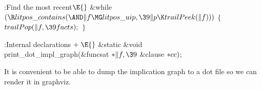 {{{{{
\Y\B\4:Find the most recent\X${}\E{}$\6
\&{while} ${}(\R\\{litpos\_contains}({\AND}\|f\MG\\{litpos\_uip},\39\|p\K%
\\{trailPeek}(\|f))){}$\5
${}\{{}$\1\6
${}\\{trailPop}(\|f,\39\\{facts});{}$\6
\4${}\}{}$\2\par
\fi

\Y\B\4:Internal declarations\X${}\mathrel+\E{}$\6
\&{static} \&{void} \\{print\_dot\_impl\_graph}(\&{funcsat} ${}{*}\|f,\39{}$%
\&{clause} ${}{*}\\{cc}){}$;\par
\fi

It is convenient to be able to dump the implication graph to a dot file
so we can
render it in graphviz.

}}}}}
